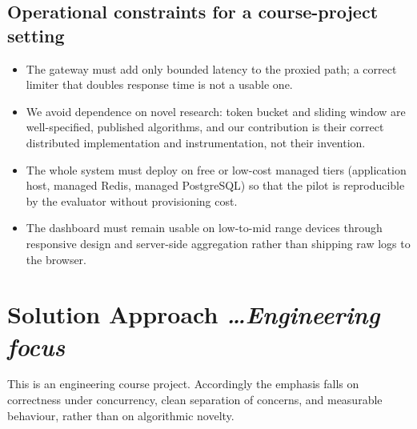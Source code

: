 \documentclass[11pt,a4paper]{article}
\newcommand{\BvrHint}[1]{%
  {\normalfont\normalsize\itshape\hfill #1}}
\begin{document}
\subsection{Operational constraints for a course-project setting}
\begin{itemize}[leftmargin=0.7cm]
    \item The gateway must add only bounded latency to the proxied path; a
      correct limiter that doubles response time is not a usable one.
    \item We avoid dependence on novel research: token bucket and sliding
      window are well-specified, published algorithms, and our contribution is
      their correct distributed implementation and instrumentation, not their
      invention.
    \item The whole system must deploy on free or low-cost managed tiers
      (application host, managed Redis, managed PostgreSQL) so that the pilot
      is reproducible by the evaluator without provisioning cost.
    \item The dashboard must remain usable on low-to-mid range devices through
      responsive design and server-side aggregation rather than shipping raw
      logs to the browser.
\end{itemize}

\section{Solution Approach %
\BvrHint{\ldots Engineering focus}}
This is an engineering course project. Accordingly the emphasis falls on
correctness under concurrency, clean separation of concerns, and measurable
behaviour, rather than on algorithmic novelty.
\end{document}
